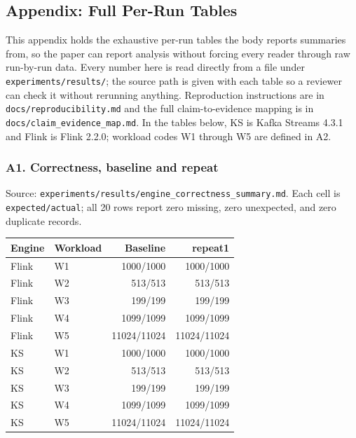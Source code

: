 \hypertarget{appendix-full-per-run-tables}{%
\subsection{Appendix: Full Per-Run
Tables}\label{appendix-full-per-run-tables}}

This appendix holds the exhaustive per-run tables the body reports
summaries from, so the paper can report analysis without forcing every
reader through raw run-by-run data. Every number here is read directly
from a file under \texttt{experiments/results/}; the source path is
given with each table so a reviewer can check it without rerunning
anything. Reproduction instructions are in
\texttt{docs/reproducibility.md} and the full claim-to-evidence mapping
is in \texttt{docs/claim\_evidence\_map.md}. In the tables below, KS is
Kafka Streams 4.3.1 and Flink is Flink 2.2.0; workload codes W1 through
W5 are defined in A2.

\hypertarget{a1.-correctness-baseline-and-repeat}{%
\subsubsection{A1. Correctness, baseline and
repeat}\label{a1.-correctness-baseline-and-repeat}}

Source: \texttt{experiments/results/engine\_correctness\_summary.md}.
Each cell is \texttt{expected/actual}; all 20 rows report zero missing,
zero unexpected, and zero duplicate records.

\begin{longtable}[]{@{}llrr@{}}
\toprule\noalign{}
Engine & Workload & Baseline & repeat1 \\
\midrule\noalign{}
\endhead
\bottomrule\noalign{}
\endlastfoot
Flink & W1 & 1000/1000 & 1000/1000 \\
Flink & W2 & 513/513 & 513/513 \\
Flink & W3 & 199/199 & 199/199 \\
Flink & W4 & 1099/1099 & 1099/1099 \\
Flink & W5 & 11024/11024 & 11024/11024 \\
KS & W1 & 1000/1000 & 1000/1000 \\
KS & W2 & 513/513 & 513/513 \\
KS & W3 & 199/199 & 199/199 \\
KS & W4 & 1099/1099 & 1099/1099 \\
KS & W5 & 11024/11024 & 11024/11024 \\
\end{longtable}

